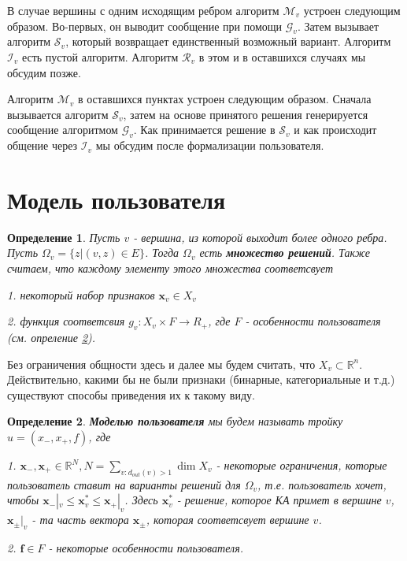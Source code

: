 \documentclass[12pt]{article}
\newtheorem{defin}{Определение}[section]
\begin{document}
В случае вершины с одним исходящим ребром алгоритм $\mathcal{M}_v$ устроен следующим образом. Во-первых, он выводит сообщение при помощи $\mathcal{G}_v$. Затем вызывает алгоритм $\mathcal{S}_v$, который возвращает единственный возможный вариант. Алгоритм $\mathcal{I}_v$ есть пустой алгоритм. Алгоритм $\mathcal{R}_v$ в этом и в оставшихся случаях мы обсудим позже.

Алгоритм $\mathcal{M}_v$ в оставшихся пунктах устроен следующим образом. Сначала вызывается алгоритм $\mathcal{S}_v$, затем на основе принятого решения генерируется сообщение алгоритмом $\mathcal{G}_v$. Как принимается решение в $\mathcal{S}_v$ и как происходит общение через $\mathcal{I}_v$ мы обсудим после формализации пользователя.

\section{Модель пользователя}

\begin{defin}
Пусть $v$ - вершина, из которой выходит более одного ребра. Пусть $\Omega_v = \{z|(v,z)\in E\}$. Тогда $\Omega_v$ есть \textbf{множество решений}. Также считаем, что каждому элементу этого множества соответсвует 

1. некоторый набор признаков $\textbf{x}_v \in X_v$

2. функция соответсвия $g_v:X_v\times F \rightarrow R_+$, где $F$ - особенности пользователя (см. опреление \ref{user_def}).
\end{defin}

Без ограничения общности здесь и далее мы будем считать, что $X_v \subset \mathbb{R}^n$. Действительно, какими бы не были признаки (бинарные, категориальные и т.д.) существуют способы приведения их к такому виду.

\begin{defin}
\label{user_def}
\textbf{Моделью пользователя} мы будем называть тройку $u = (x_-, x_+, f)$, где

1. $\textbf{x}_-, \textbf{x}_+\in \mathbb{R}^N, N={\sum\limits_{v:d_{out}(v)>1} \dim X_v}$ - некоторые ограничения, которые пользователь ставит на варианты решений для $\Omega_v$, т.е. пользователь хочет, чтобы $\textbf{x}_-|_v \leq \textbf{x}_v^* \leq \textbf{x}_+|_v$. Здесь $\textbf{x}_v^*$ - решение, которое КА примет в вершине $v$, $\textbf{x}_\pm|_v$ - та часть вектора $\textbf{x}_\pm$, которая соответсвует вершине $v$.

2. $\textbf{f}\in F$ - некоторые особенности пользователя.
\end{defin}
\end{document}
